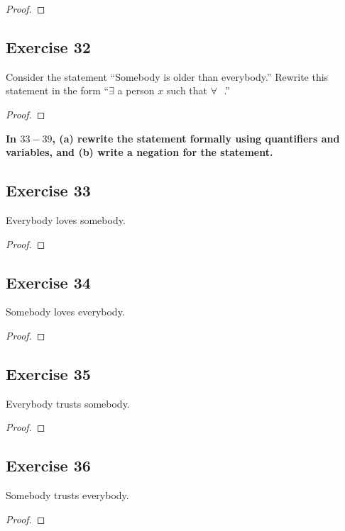 \documentclass[14pt]{extarticle}
\newcommand{\fbl}{\underline{\hspace{1cm}}\,\,}
\newcommand{\fa}{\forall}
\newcommand{\te}{\exists}
\begin{document}
\begin{proof}

\end{proof}

\subsection{Exercise 32}
Consider the statement “Somebody is older than everybody.” Rewrite this statement in the form “$\te$ a person $x$ such that $\fa$ \fbl.”

\begin{proof}

\end{proof}

{\bf \color{cyan} In $33-39$, (a) rewrite the statement formally using quantifiers and variables, and (b) write a negation for the statement.}

\subsection{Exercise 33}
Everybody loves somebody.

\begin{proof}

\end{proof}

\subsection{Exercise 34}
Somebody loves everybody.

\begin{proof}

\end{proof}

\subsection{Exercise 35}
Everybody trusts somebody.

\begin{proof}

\end{proof}

\subsection{Exercise 36}
Somebody trusts everybody.

\begin{proof}

\end{proof}
\end{document}
